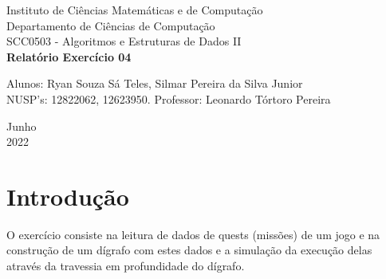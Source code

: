 \documentclass[a4paper, 12pt]{article}
\begin{document}

\begin{titlepage}
	\begin{center}
	

		\Huge{Instituto de Ciências Matemáticas e de Computação}\\
		\large{Departamento de Ciências de Computação}\\ 
		\large{SCC0503 - Algoritmos e Estruturas de Dados II}\\ 
		\vspace{15pt}
        \vspace{95pt}
        \textbf{\LARGE{Relatório Exercício 04}}\\
		\vspace{3,5cm}
	\end{center}
	
	\begin{flushleft}
		\begin{tabbing}
			Alunos: Ryan Souza Sá Teles, Silmar Pereira da Silva Junior \\
            NUSP's: 12822062, 12623950.
			Professor: Leonardo Tórtoro Pereira\\
	\end{tabbing}
 \end{flushleft}
	\vspace{1cm}
	
	\begin{center}
		\vspace{\fill}
			 Junho\\
		 2022
			\end{center}
\end{titlepage}

\newpage
\newpage
\tableofcontents
\thispagestyle{empty}

\newpage
{}
\section{Introdução}
O exercício consiste na leitura de dados de quests (missões) de um jogo e na construção de um dígrafo com estes dados e a simulação da execução delas através da travessia em profundidade do dígrafo.
\newpage
\end{document}
